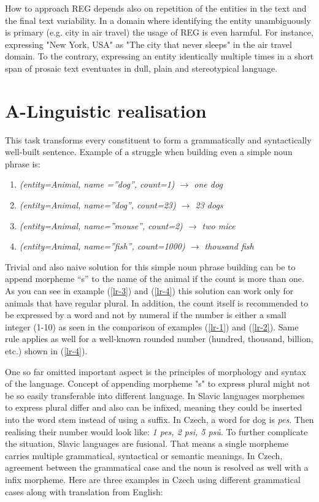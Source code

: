 How to approach REG depends also on repetition of the entities in the text and the final text variability. In a domain where identifying the entity unambiguously is primary (e.g. city in air travel) the usage of REG is even harmful. For instance, expressing "New York, USA" as "The city that never sleeps" in the air travel domain. To the contrary, expressing an entity identically multiple times in a short span of prosaic text eventuates in dull, plain and stereotypical language. 

\section{A-Linguistic realisation}
This task transforms every constituent to form a grammatically and syntactically well-built sentence. Example of a struggle when building even a simple noun phrase is:
\begin{enumerate}
	\item \emph{(entity=Animal, name =”dog”, count=1) $\rightarrow$ one dog} \label{lr-1}
	\item \emph{(entity=Animal, name=”dog”, count=23) $\rightarrow$ 23 dogs} \label{lr-2}
	\item \emph{(entity=Animal, name=”mouse”, count=2) $\rightarrow$ two mice} \label{lr-3}
	\item \emph{(entity=Animal, name=”fish”, count=1000) $\rightarrow$ thousand fish} \label{lr-4}
\end{enumerate}

Trivial and also naive solution for this simple noun phrase building can be to append morpheme “s” to the name of the animal if the count is more than one. As you can see in example (\ref{lr-3}) and (\ref{lr-4}) this solution can work only for animals that have regular plural. In addition, the count itself is recommended to be expressed by a word and not by numeral if the number is either a small integer (1-10) as seen in the comparison of  examples (\ref{lr-1}) and (\ref{lr-2}). Same rule applies as well for a well-known rounded number (hundred, thousand, billion, etc.) shown in (\ref{lr-4}).

One so far omitted important aspect is the principles of morphology and syntax of the language. Concept of appending morpheme "s" to express plural might not be so easily transferable into different language. In Slavic languages morphemes to express plural differ and also can be infixed, meaning they could be inserted into the word stem instead of using a suffix. In Czech, a word for dog is \emph{pes}. Then realising their number would look like: \emph{1 pes, 2 psi, 5 psů}. To further complicate the situation, Slavic languages are fusional. That means a single morpheme carries multiple grammatical, syntactical or semantic meanings. In Czech, agreement between the grammatical case and the noun is resolved as well with a infix morpheme. Here are three examples in Czech using different grammatical cases along with translation from English:

